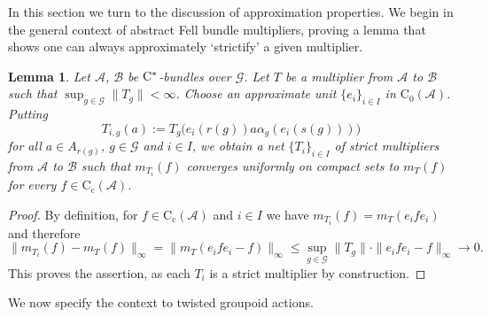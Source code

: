 \documentclass[11 pt, leqno]{amsart}
\numberwithin{equation}{section}
\theoremstyle{plain}
\newtheorem {lem} [thm]{Lemma}
\theoremstyle{definition}
\newcommand*{\contc}{\mathrm{C_c}}%
\newcommand*{\contz}{\mathrm{C_0}}%
\newcommand{\B}{\mathcal B}
\newcommand{\m}{m}
\newcommand{\G}{\mathcal G} %
\newcommand{\A}{\mathcal A}
\newcommand{\cst}{\ifmmode\mathrm{C}^*\else{$\mathrm{C}^*$}\fi}
\begin{document}
In this section we turn to the discussion of approximation properties. 
We begin in the general context of abstract Fell bundle multipliers, proving a lemma that shows one can always approximately `strictify' a given multiplier. 
\begin{lem}\label{lem:multiplier_approx_with strict}
Let $\A$, $\B$  be $\cst$-bundles over $\G$. 
Let $T$ be a multiplier from $\A$ to $\B$ such that $\sup_{g\in \G} \| T_g \|<\infty$. 
Choose an approximate unit $\{e_i\}_{i\in I}$ in $\contz(\A)$.
Putting 
\[
    T_{i,g}(a) := T_g \big( e_i(r(g)) a \alpha_g(e_i(s(g))) \big)
\] 
for all $a\in A_{r(g)}$, $g\in \G$ and $i\in I$,  
we obtain a net $\{T_{i}\}_{i\in I}$ of strict multipliers from $\A$ to $\B$ such that $\m_{T_i}(f)$ converges uniformly on compact sets to $\m_{T}(f)$  for every $f\in\contc(\A)$. 
\end{lem}
\begin{proof} 
By definition, for $f\in\contc(\A)$ and $i \in I$ we have $\m_{T_i}(f)=\m_T(e_if e_i)$ and therefore
\[
    \| \m_{T_i}(f) - \m_{T}(f) \|_{\infty} = \| \m_{T}(e_ife _i-f) \|_{\infty} \leq \sup_{g\in \G} \| T_g \|\cdot \|e_ife _i-f\|_{\infty}\to 0.
\]
This proves the assertion, as each $T_{i}$ is a strict multiplier by construction. 
\end{proof}

We now specify the context to twisted groupoid actions.
\end{document}
